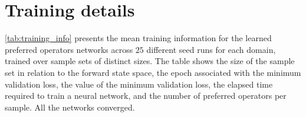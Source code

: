 \documentclass[ppgc,diss,english]{iiufrgs}
\begin{document}
\chapter{Training details}
\cref{tab:training_info} presents the mean training information for the learned preferred operators \pog networks across $25$ different seed runs for each domain, trained over sample sets of distinct sizes. The table shows the size of the sample set in relation to the forward state space, the epoch associated with the minimum validation loss, the value of the minimum validation loss, the elapsed time required to train a neural network, and the number of preferred operators per sample. All the networks converged.


\end{document}
